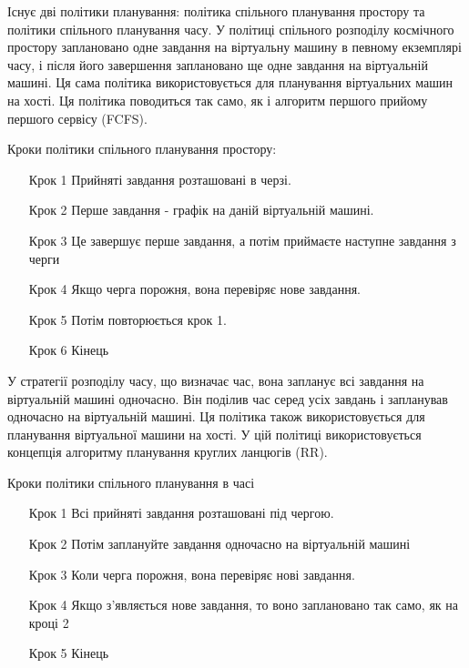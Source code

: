 Існує дві політики планування: політика спільного планування простору та політики спільного планування часу. У політиці спільного розподілу космічного простору заплановано одне завдання на віртуальну машину в певному екземплярі часу, і після його завершення заплановано ще одне завдання на віртуальній машині. Ця сама політика використовується для планування віртуальних машин на хості. Ця політика поводиться так само, як і алгоритм першого прийому першого сервісу (FCFS).

Кроки політики спільного планування простору:
\begin{itemize}
	\item[Крок 1] Прийняті завдання розташовані в черзі.
	\item[Крок 2] Перше завдання - графік на даній віртуальній машині.
	\item[Крок 3] Це завершує перше завдання, а потім приймаєте наступне завдання з черги
	\item[Крок 4] Якщо черга порожня, вона перевіряє нове завдання.
	\item[Крок 5] Потім повторюється крок 1.
	\item[Крок 6] Кінець
\end{itemize}

У стратегії розподілу часу, що визначає час, вона запланує всі завдання на віртуальній машині одночасно. Він поділив час серед усіх завдань і запланував одночасно на віртуальній машині. Ця політика також використовується для планування віртуальної машини на хості. У цій політиці використовується концепція алгоритму планування круглих ланцюгів (RR).

Кроки політики спільного планування в часі
\begin{itemize}
	\item[Крок 1] Всі прийняті завдання розташовані під чергою.
	\item[Крок 2] Потім заплануйте завдання одночасно на віртуальній машині
	\item[Крок 3] Коли черга порожня, вона перевіряє нові завдання.
	\item[Крок 4] Якщо з'являється нове завдання, то воно заплановано так само, як на кроці 2
	\item[Крок 5] Кінець
\end{itemize}


